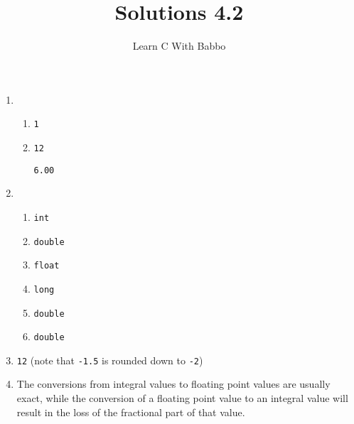 \documentclass{article}
\begin{document}
\title{Solutions 4.2}
\author{Learn C With Babbo}
\date{}
\maketitle

\begin{enumerate}
\item

\begin{enumerate}
\item 
\begin{lstlisting}[style=CStyle]
1
\end{lstlisting}

\item
\begin{lstlisting}[style=CStyle]
12
\end{lstlisting}

\begin{lstlisting}[style=CStyle]
6.00
\end{lstlisting}
\end{enumerate}

\item
\begin{enumerate}

\item 
\begin{lstlisting}[style=CStyle]
int
\end{lstlisting}

\item
\begin{lstlisting}[style=CStyle]
double
\end{lstlisting}

\item 
\begin{lstlisting}[style=CStyle]
float
\end{lstlisting}

\item
\begin{lstlisting}[style=CStyle]
long
\end{lstlisting}

\item
\begin{lstlisting}[style=CStyle]
double
\end{lstlisting}

\item
\begin{lstlisting}[style=CStyle]
double
\end{lstlisting}
\end{enumerate}

\item \verb|12| (note that \verb|-1.5| is rounded down to \verb|-2|)

\item The conversions from integral values to floating point values are usually exact, while the conversion of a 
floating point value to an integral value will result in the loss of the fractional part of that value.
\end{enumerate}
\end{document}
